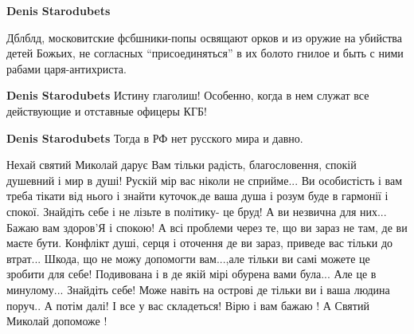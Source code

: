 \begin{itemize}
\begin{itemize}
\textbf{Denis Starodubets} 

Дблблд, московитские фсбшники-попы освящают орков и из оружие на убийства детей
Божьих, не согласных \enquote{присоединяться} в их болото гнилое и быть с ними рабами
царя-антихриста.


\textbf{Denis Starodubets} Истину глаголиш! Особенно, когда в нем служат все действующие и отставные офицеры КГБ!

\textbf{Denis Starodubets} Тогда в РФ нет русского мира и давно.

\end{itemize} %


Нехай святий Миколай дарує Вам тільки радість, благословення, спокій душевний і
мир в душі! Рускій мір вас ніколи не сприйме... Ви особистість і вам треба тікати
від нього і знайти куточок,де ваша душа і розум буде в гармонії і спокої.
Знайдіть себе і не лізьте в політику- це бруд! А ви незвична для них... Бажаю вам
здоров'Я і спокою! А всі проблеми через те, що ви зараз не там, де ви маєте
бути. Конфлікт душі, серця і оточення де ви зараз, приведе вас тільки до втрат...
Шкода, що не можу допомогти вам...,але тільки ви самі можете це зробити для себе!
Подивована і в де якій мірі обурена вами була... Але це в минулому... Знайдіть
себе! Може навіть на острові де тільки ви і ваша людина поруч.. А потім далі! І
все у вас складеться! Вірю і вам бажаю ! А Святий Миколай допоможе !

\end{itemize} %

